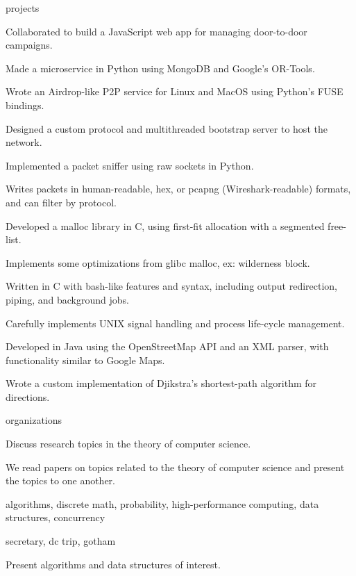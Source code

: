 \documentclass{cv}
\begin{document}
\begin{cvsection}{projects}
  {
    \item Collaborated to build a JavaScript web app for managing door-to-door campaigns.
    \item Made a microservice in Python using MongoDB and Google's OR-Tools.
  }
  {
    \item Wrote an Airdrop-like P2P service for Linux and MacOS using Python's FUSE bindings.
    \item Designed a custom protocol and multithreaded bootstrap server to host the network.
  }
  {
    \item Implemented a packet sniffer using raw sockets in Python. 
    \item Writes packets in human-readable, hex, or pcapng (Wireshark-readable) formats, and can filter by protocol.
  }
  {
    \item Developed a malloc library in C, using first-fit allocation with a segmented free-list.
    \item Implements some optimizations from glibc malloc, ex: wilderness block.
  }
  {
    \item Written in C with bash-like features and syntax, including output redirection, piping, and background jobs. 
    \item Carefully implements UNIX signal handling and process life-cycle management.
  }
  {
    \item Developed in Java using the OpenStreetMap API and an XML parser, with functionality similar to Google Maps.
    \item Wrote a custom implementation of Djikstra's shortest-path algorithm for directions.
  }
\end{cvsection}

\begin{cvsection}{organizations}
  {
    \item Discuss research topics in the theory of computer science.
    \item We read papers on topics related to the theory of computer science and present the topics to one another.
    \item algorithms, discrete math, probability, high-performance computing, data structures, concurrency
  }
  {
    \item secretary, dc trip, gotham
  }
  {
    \item Present algorithms and data structures of interest.
  } 
\end{cvsection}
\end{document}
